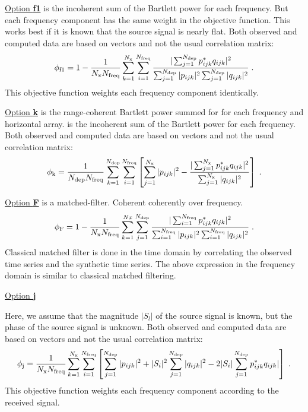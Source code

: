 \documentclass{saclantc}
\begin{document}
 \underline{Option {\bf f1}}
is the incoherent sum of the Bartlett power for each frequency. But
each frequency component has the same weight in the objective
function. This works best if it is known that the source signal is
nearly flat.
Both observed and computed data  are based on 
vectors and not  the usual correlation matrix: 
\begin{equation}
 \phi_{\rm f1}= 1- \frac{1}{N_{\rm x}{N _{\rm freq}}}
  \sum^{N_{\rm x}}_{k=1} \sum^{N _{\rm freq}}_{i=1} 
{{|\sum^{N _{\rm dep}}_{j=1} {p}_{ijk}^{\rm *} {q}_{ijk}|^2}
      \over {\sum^{N _{\rm dep}}_{j=1} |{p}_{ijk}|^2
             \sum^{N _{\rm dep}}_{j=1} |{q}_{ijk}|^2}}
  \; .
\label{eq:objf1}
\end{equation}
This objective function weights each frequency component identically.

\underline{Option {\bf k}}
is the range-coherent Bartlett power summed for  for each frequency and horizontal array. 
is the incoherent sum of the Bartlett power for each frequency. 
Both observed and computed data  are based on 
vectors and not  the usual correlation matrix: 
\begin{equation}
 \phi_{\rm k}= \frac{1}{N_{\rm dep}{N _{\rm freq}}}
  \sum^{N_{\rm dep}}_{k=1} \sum^{N _{\rm freq}}_{i=1} \left[
   \sum^{N _{\rm x}}_{j=1} |{p}_{ijk}|^2 -
{{|\sum^{N _{\rm x}}_{j=1} {p}_{ijk}^{\rm *} {q}_{ijk}|^2}
      \over {
             \sum^{N _{\rm x}}_{j=1} |{q}_{ijk}|^2}}\right]
  \; .
\label{eq:objk}
\end{equation}

\underline{Option {\bf F}}  is a matched-filter. Coherent coherently over frequency.
\begin{equation}
 \phi_{\rm F}= 1- \frac{1}{N_{\rm x}{N _{\rm freq}}}
  \sum^{Nx}_{k=1} \sum^{N _{\rm dep}}_{j=1} 
{{|\sum^{N _{\rm freq}}_{i=1} {p}_{ijk}^{ *}{q}_{ijk}|^2}
      \over {\sum^{N_{ \rm freq}}_{i=1} |{p}_{ijk}|^2
             \sum^{N _{\rm freq}}_{i=1} |{q}_{ijk}|^2}}
  \; .
\label{eq:objF}
\end{equation}
Classical matched filter is done in the time domain by correlating the
observed time series and the synthetic time series. The above expression in the frequency domain is similar to
classical matched filtering. 

\underline{Option {\bf j}}

Here, we assume that the magnitude $|S_l |$ of the
source signal is  known, but the phase of the source signal is unknown. 
Both observed and computed data  are based on 
vectors and not  the usual correlation matrix: 
\begin{equation}
 \phi_{\rm j}= \frac{1}{N_{\rm x}{N _{\rm freq}}}
  \sum^{N_{\rm x}}_{k=1} \sum^{N _{\rm freq}}_{i=1} \left[
            \sum^{N _{\rm dep}}_{j=1} |{p}_{ijk}|^2 
   +|S_i|^2 \sum^{N _{\rm dep}}_{j=1} |{q}_{ijk}|^2
 -2|S_i {|\sum^{N _{\rm dep}}_{j=1} {p}_{ijk}^{\rm *} {q}_{ijk}|}
      \right]
  \; .
\label{eq:objj}
\end{equation}
This objective function weights each frequency component according to
the received signal.
\end{document}
